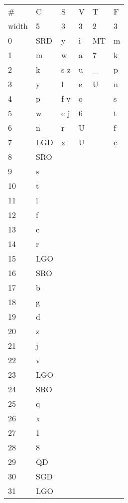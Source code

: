 \documentclass[12pt]{report}
\begin{document}
\begin{tabular}[c]{@{}llllll@{}}
\toprule
\#     & C   & S   & V & T   & F \\
width & 5   & 3   & 3 & 2   & 3 \\
\midrule
0     & SRD & y   & i & MT  & m \\
1     & m   & w   & a & 7   & k \\
2     & k   & s z & u & \_   & p \\
3     & y   & l   & e & U   & n \\
4     & p   & f v & o &     & s \\
5     & w   & c j & 6 &     & t \\
6     & n   & r   & U &     & f \\
7     & LGD & x   & U &     & c \\
8     & SRO &     &   &     &   \\
9     & s   &     &   &     &   \\
10    & t   &     &   &     &   \\
11    & l   &     &   &     &   \\
12    & f   &     &   &     &   \\
13    & c   &     &   &     &   \\
14    & r   &     &   &     &   \\
15    & LGO &     &   &     &   \\
16    & SRO &     &   &     &   \\
17    & b   &     &   &     &   \\
18    & g   &     &   &     &   \\
19    & d   &     &   &     &   \\
20    & z   &     &   &     &   \\
21    & j   &     &   &     &   \\
22    & v   &     &   &     &   \\
23    & LGO &     &   &     &   \\
24    & SRO &     &   &     &   \\
25    & q   &     &   &     &   \\
26    & x   &     &   &     &   \\
27    & 1   &     &   &     &   \\
28    & 8   &     &   &     &   \\
29    & QD  &     &   &     &   \\
30    & SGD &     &   &     &   \\
31    & LGO &     &   &     &   \\
\bottomrule
\end{tabular}
\end{document}
